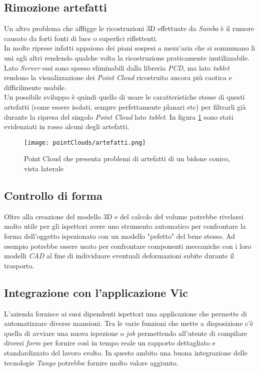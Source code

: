 \subsection{Rimozione artefatti}
Un altro problema che affligge le ricostruzioni 3D effettuate da \emph{Samba} è il rumore causato da forti fonti di luce o superfici riflettenti.\\
In molte riprese infatti appaiono dei piani sospesi a mezz'aria che si sommmano li uni agli altri rendendo qualche volta la ricostruzione praticamente inutilizzabile. Lato \emph{Server} essi sono spesso eliminabili dalla libreria \emph{PCD}, ma lato \emph{tablet} rendono la visualizzazione dei \emph{Point Cloud} ricostruito ancora più caotica e difficilmente usabile.\\
Un possibile sviluppo è quindi quello di usare le caratteristiche stesse di questi artefatti (come essere isolati, sempre perfettamente planari etc) per filtrarli già durante la ripresa del singolo \emph{Point Cloud} lato \emph{tablet}. In figura \ref{figure:pcloud_artifacts} sono stati evidenziati in rosso alcuni degli artefatti.
\begin{figure}[!h] 
    \centering 
    \texttt{[image: pointClouds/artefatti.png]} 
    \caption{Point Cloud che presenta problemi di artefatti di un bidone conico, vista laterale}
    \label{figure:pcloud_artifacts}
\end{figure}

\subsection{Controllo di forma}
Oltre alla creazione del modello 3D e del calcolo del volume potrebbe rivelarsi molto utile per gli ispettori avere uno strumento automatico per confrontare la forma dell'oggetto ispezionato con un modello "pefetto" del bene stesso. Ad esempio potrebbe essere usato per confrontare componenti meccaniche con i loro modelli \emph{CAD} al fine di individuare eventuali deformazioni subite durante il trasporto.

\subsection{Integrazione con l'applicazione Vic}
L'azienda fornisce ai suoi dipendenti ispettori una applicazione che permette di automatizzare diverse mansioni. Tra le varie funzioni che mette a disposizione c'è quella di avviare una nuova ispezione o \emph{job} permettendo all'utente di compilare diversi \emph{form} per fornire così in tempo reale un rapporto dettagliato e standardizzato del lavoro svolto. In questo ambito una buona integrazione delle tecnologie \emph{Tango} potrebbe fornire molto valore aggiunto.


